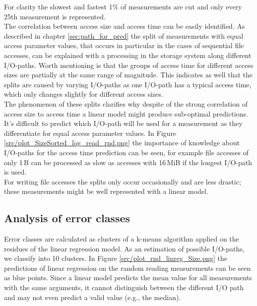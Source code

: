 \documentclass{superfri}
\begin{document}

For clarity the slowest and fastest 1\% of measurements are cut and only every 25th measurement is represented.\\
The correlation between access size and access time can be easily identified.
As described in chapter \ref{sec:path_for_pred} the split of measurements with equal access parameter values, that occurs in particular in the cases of sequential file accesses, can be explained with a processing in the storage system along different I/O-paths.
Worth mentioning is that the groups of access time for different access sizes are partially at the same range of magnitude.
This indicates as well that the splits are caused by varying I/O-paths as one I/O-path has a typical access time, which only changes slightly for different access sizes.\\
The phenomenon of these splits clarifies why despite of the strong correlation of access size to access time a linear model might produce sub-optimal predictions. It's difficult to predict which I/O-path will be used for a measurement as they differentiate for equal access parameter values.
In Figure \ref{src/plot_SizeSorted_log_read_rnd.png} the importance of knowledge about I/O-paths for the  access time prediction can be seen, for example file accesses of only 1\,B can be processed as slow as accesses with 16\,MiB if the longest I/O-path is used.\\
For writing file accesses the splits only occur occasionally and are less drastic; these measurements might be well represented with a linear model.

\subsection{Analysis of error classes}
Error classes are calculated as clusters of a k-means algorithm applied on the residues of the linear regression model.
As an estimation of possible I/O-paths, we classify into 10 clusters.
In Figure \ref{src/plot_rnd_linreg_Size.png} the predictions of linear regression on the random reading measurements can be seen as blue points.
Since a linear model predicts the mean value for all measurements with the same arguments, it cannot distinguish between the different I/O path and may not even predict a valid value (e.g., the median).
\end{document}
